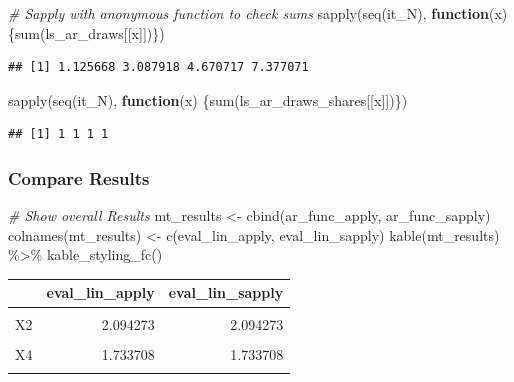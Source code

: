 \documentclass[
]{book}
\newenvironment{Shaded}{\begin{snugshade}}{\end{snugshade}}
\newcommand{\CommentTok}[1]{\textcolor[rgb]{0.56,0.35,0.01}{\textit{#1}}}
\newcommand{\ControlFlowTok}[1]{\textcolor[rgb]{0.13,0.29,0.53}{\textbf{#1}}}
\newcommand{\FunctionTok}[1]{\textcolor[rgb]{0.00,0.00,0.00}{#1}}
\newcommand{\NormalTok}[1]{#1}
\newcommand{\OtherTok}[1]{\textcolor[rgb]{0.56,0.35,0.01}{#1}}
\newcommand{\SpecialCharTok}[1]{\textcolor[rgb]{0.00,0.00,0.00}{#1}}
\newcommand{\StringTok}[1]{\textcolor[rgb]{0.31,0.60,0.02}{#1}}
\begin{document}
\begin{Shaded}
\begin{Highlighting}[]
\CommentTok{\# Sapply with anonymous function to check sums}
\FunctionTok{sapply}\NormalTok{(}\FunctionTok{seq}\NormalTok{(it\_N), }\ControlFlowTok{function}\NormalTok{(x) \{}\FunctionTok{sum}\NormalTok{(ls\_ar\_draws[[x]])\})}
\end{Highlighting}
\end{Shaded}

\begin{verbatim}
## [1] 1.125668 3.087918 4.670717 7.377071
\end{verbatim}

\begin{Shaded}
\begin{Highlighting}[]
\FunctionTok{sapply}\NormalTok{(}\FunctionTok{seq}\NormalTok{(it\_N), }\ControlFlowTok{function}\NormalTok{(x) \{}\FunctionTok{sum}\NormalTok{(ls\_ar\_draws\_shares[[x]])\})}
\end{Highlighting}
\end{Shaded}

\begin{verbatim}
## [1] 1 1 1 1
\end{verbatim}

\hypertarget{compare-results}{%
\subsubsection{Compare Results}\label{compare-results}}

\begin{Shaded}
\begin{Highlighting}[]
\CommentTok{\# Show overall Results}
\NormalTok{mt\_results }\OtherTok{\textless{}{-}} \FunctionTok{cbind}\NormalTok{(ar\_func\_apply, ar\_func\_sapply)}
\FunctionTok{colnames}\NormalTok{(mt\_results) }\OtherTok{\textless{}{-}} \FunctionTok{c}\NormalTok{(}\StringTok{\textquotesingle{}eval\_lin\_apply\textquotesingle{}}\NormalTok{, }\StringTok{\textquotesingle{}eval\_lin\_sapply\textquotesingle{}}\NormalTok{)}
\FunctionTok{kable}\NormalTok{(mt\_results) }\SpecialCharTok{\%\textgreater{}\%} \FunctionTok{kable\_styling\_fc}\NormalTok{()}
\end{Highlighting}
\end{Shaded}

\begin{table}[!h]
\centering
\begin{tabular}{l|r|r}
\hline
  & eval\_lin\_apply & eval\_lin\_sapply\\
\hline
\cellcolor{gray!6}{X1} & \cellcolor{gray!6}{2.346356} & \cellcolor{gray!6}{2.346356}\\
\hline
X2 & 2.094273 & 2.094273\\
\hline
\cellcolor{gray!6}{X3} & \cellcolor{gray!6}{1.895316} & \cellcolor{gray!6}{1.895316}\\
\hline
X4 & 1.733708 & 1.733708\\
\hline
\cellcolor{gray!6}{X5} & \cellcolor{gray!6}{1.599477} & \cellcolor{gray!6}{1.599477}\\
\hline
\end{tabular}
\end{table}
\end{document}

